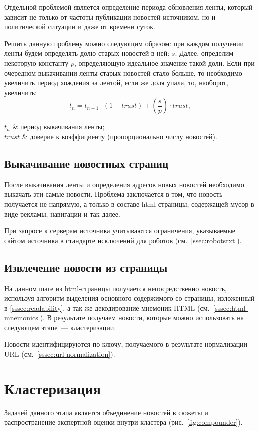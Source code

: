 Отдельной проблемой является определение периода обновления ленты, который зависит не только от частоты публикации новостей источником, но и политической ситуации и даже от времени суток.

Решить данную проблему можно следующим образом: при каждом получении ленты будем определять долю старых новостей в ней: $s$. Далее, определим некоторую константу $p$, определяющую идеальное значение такой доли. Если при очередном выкачивании ленты старых новостей стало больше, то необходимо увеличить период хождения за лентой, если же доля упала, то, наоборот, увеличить:
\begin{equation}
    t_n=t_{n-1}\cdot(1-trust)+\left(\frac{s}{p}\right)\cdot trust,
\end{equation}
\begin{conditions}
    $t_n$ & период выкачивания ленты; \\
    $trust$ & доверие к коэффициенту (пропорционально числу новостей). \\
\end{conditions}

\subsection{Выкачивание новостных страниц}
После выкачивания ленты и определения адресов новых новостей необходимо выкачать эти самые новости. Проблема заключается в том, что новость получается не напрямую, а только в составе html-страницы, содержащей мусор в виде рекламы, навигации и так далее.

При запросе к серверам источника учитываются ограничения, указываемые сайтом источника в стандарте исключений для роботов (см.~\ref{ssec:robotstxt}).

\subsection{Извлечение новости из страницы}
На данном шаге из html-страницы получается непосредственно новость, используя алгоритм выделения основного содержимого со страницы, изложенный в \ref{sssec:readability}, а так же декодирование мнемоник HTML (см.~\ref{sssec:html-mnemonics}). В результате получаем новости, которые можно использовать на следующем этапе~--- кластеризации.

Новости идентифицируются по ключу, получаемого в результате нормализации URL (см.~\ref{sssec:url-normalization}).

\section{Кластеризация}
Задачей данного этапа является объединение новостей в сюжеты и распространение экспертной оценки внутри кластера (рис.~\ref{fig:compounder}).

